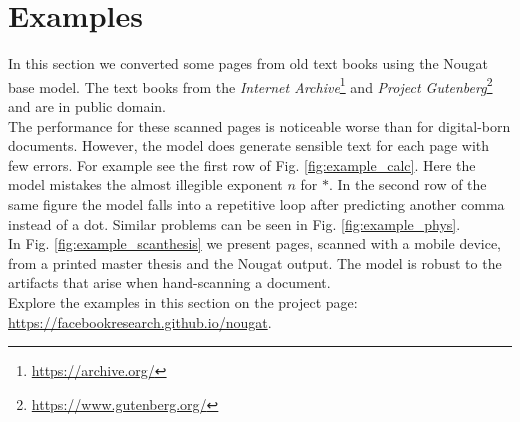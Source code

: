 \documentclass[]{article}
\newcommand{\footurl}[1]{\footnote{\url{#1}}}
\begin{document}
\section{Examples}\label{seq:examples}
In this section we converted some pages from old text books using the Nougat base model. The text books from the \emph{Internet Archive}\footurl{https://archive.org/} and \emph{Project Gutenberg}\footurl{https://www.gutenberg.org/} and are in public domain.
\\The performance for these scanned pages is noticeable worse than for digital-born documents. However, the model does generate sensible text for each page with few errors. For example see the first row of Fig. \ref{fig:example_calc}. Here the model mistakes the almost illegible exponent $n$ for $\ast$. In the second row of the same figure the model falls into a repetitive loop after predicting another comma instead of a dot. Similar problems can be seen in Fig. \ref{fig:example_phys}.
\\In Fig. \ref{fig:example_scanthesis} we present pages, scanned with a mobile device, from a printed master thesis and the Nougat output. The model is robust to the artifacts that arise when hand-scanning a document.
\\Explore the examples in this section on the project page: \url{https://facebookresearch.github.io/nougat}.
\end{document}
